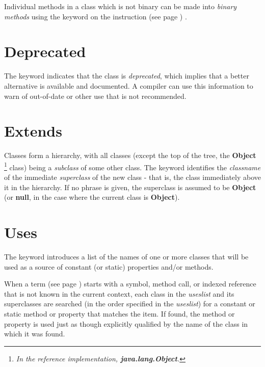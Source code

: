 Individual methods in a class which is not binary can be made into
\emph{binary methods} using the  keyword on the
  instruction (see page \pageref{refmethod}) .
\section{Deprecated}\label{refdepcla}
 
The keyword  indicates that the class
is \emph{deprecated}, which implies that a better alternative is
available and documented.  A compiler can use this information to warn
of out-of-date or other use that is not recommended.
\section{Extends}
 
Classes form a hierarchy, with all classes (except the top of the tree,
the \textbf{Object}
\footnote{
\emph{In the reference implementation, \textbf{java.lang.Object}.}
}
class) being a \emph{subclass} of some other class.
The  keyword identifies the \emph{classname} of the
immediate \emph{superclass} of the new class - that is, the
class immediately above it in the hierarchy.
If no  phrase is given, the superclass is assumed to
be \textbf{Object} (or \textbf{null}, in the case where the current
class is \textbf{Object}).
\section{Uses}
 
The  keyword introduces a list of the names of one or
more classes that will be used as a source of constant (or static)
properties and/or methods.
 
When a  term (see page \pageref{refterms})  starts with a symbol, method call, or
indexed reference that is not known in the current context, each class
in the \emph{useslist} and its superclasses are searched (in the
order specified in the \emph{useslist}) for a constant or static
method or property that matches the item.
If found, the method or property is used just as though explicitly
qualified by the name of the class in which it was found.
 

